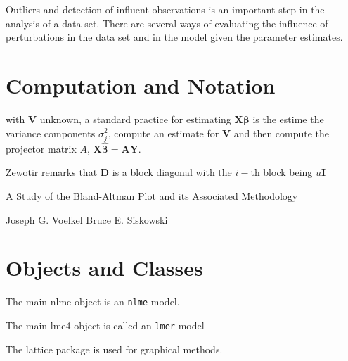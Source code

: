 \documentclass[12pt, a4paper]{report}
\theoremstyle{plain}
\theoremstyle{definition}
\theoremstyle{remark}
\begin{document}
Outliers and detection of influent observations is an important step in the analysis of a data set. There are several ways of evaluating the influence of perturbations in the data set and in the model given the parameter estimates. 


\section{Computation and Notation } %
with $\boldsymbol{V}$ unknown, a standard practice for estimating $\boldsymbol{X \beta}$ is the estime the variance components $\sigma^2_j$,
compute an estimate for $\boldsymbol{V}$ and then compute the projector matrix $A$, $\boldsymbol{X \hat{\beta}}  = \boldsymbol{AY}$.


Zewotir remarks that $\boldsymbol{D}$ is a block diagonal with the $i-$th block being $u \boldsymbol{I}$






A Study of the Bland-Altman Plot and its Associated Methodology

Joseph G. Voelkel Bruce E. Siskowski 





\section*{Objects and Classes}

The main nlme object is an \texttt{nlme} model.

The main lme4 object is called an \texttt{lmer} model

The lattice package is used for graphical methods.
\end{document}
